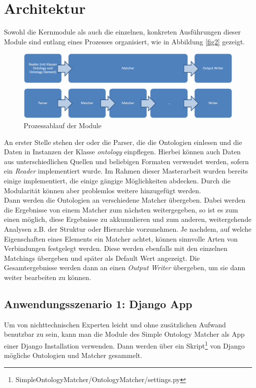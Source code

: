 		\section{Architektur}
		Sowohl die Kernmodule als auch die einzelnen, konkreten Ausführungen dieser
		Module sind entlang eines Prozesses organisiert, wie in Abbildung \ref{fig2}
		gezeigt.
		\begin{figure}[h!]
		\centering
		\includegraphics[width=1.0\textwidth]{pics/Module-overview.png}
		\caption{Prozessablauf der Module}
		\label{fig1}
		\end{figure}
		An erster Stelle stehen der oder die Parser, die die Ontologien einlesen und
		die Daten in Instanzen der Klasse \textit{ontology} einpflegen. Hierbei können
		auch Daten aus unterschiedlichen Quellen und beliebigen Formaten verwendet
		werden, sofern ein \textit{Reader} implementiert wurde. Im Rahmen dieser
		Masterarbeit wurden bereits einige implementiert, die einige gängige
		Möglichkeiten abdecken. Durch die Modularität können aber problemlos weitere
		hinzugefügt werden.\\
		Dann werden die Ontologien an verschiedene Matcher übergeben. Dabei werden
		die Ergebnisse von einem Matcher zum nächsten weitergegeben, so ist es zum
		einen möglich, diese Ergebnisse zu akkumulieren und zum
		anderen, weitergehende Analysen z.B. der Struktur oder Hierarchie vorzunehmen. Je nachdem, auf welche Eigenschaften
		eines Elements ein Matcher achtet, können sinnvolle Arten von Verbindungen
		festgelegt werden. Diese werden ebenfalls mit den einzelnen Matchings
		übergeben und später als Default Wert angezeigt. Die Gesamtergebnisse werden
		dann an einen \textit{Output Writer} übergeben, um sie dann weiter bearbeiten zu können.\\
		
		\subsection{Anwendungsszenario 1: Django App}
		Um von nichttechnischen Experten leicht und ohne zusätzlichen Aufwand
		benutzbar zu sein, kann man die Module des Simple Ontology Matcher als App
		einer Django Installation verwenden. Dann werden über ein
		Skript\footnote{SimpleOntologyMatcher/OntologyMatcher/settings.py} von Django mögliche Ontologien und Matcher gesammelt.
		
